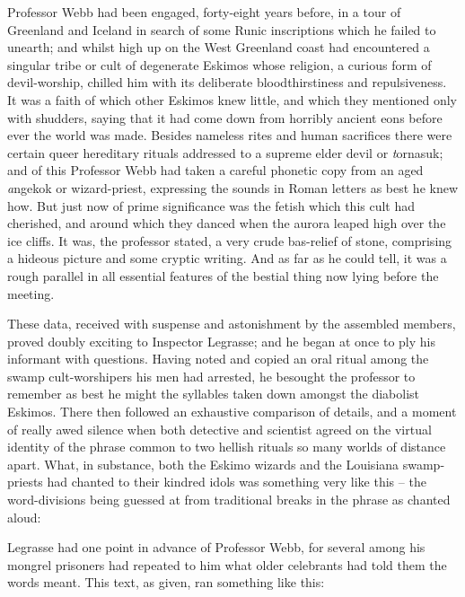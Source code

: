 Professor Webb had been engaged, forty-eight years before, in a tour of Greenland and Iceland in search of some Runic inscriptions which he failed to unearth; and whilst high up on the West Greenland coast had encountered a singular tribe or cult of degenerate Eskimos whose religion, a curious form of devil-worship, chilled him with its deliberate bloodthirstiness and repulsiveness. It was a faith of which other Eskimos knew little, and which they mentioned only with shudders, saying that it had come down from horribly ancient eons before ever the world was made. Besides nameless rites and human sacrifices there were certain queer hereditary rituals addressed to a supreme elder devil or {\emph tornasuk}; and of this Professor Webb had taken a careful phonetic copy from an aged {\emph angekok} or wizard-priest, expressing the sounds in Roman letters as best he knew how. But just now of prime significance was the fetish which this cult had cherished, and around which they danced when the aurora leaped high over the ice cliffs. It was, the professor stated, a very crude bas-relief of stone, comprising a hideous picture and some cryptic writing. And as far as he could tell, it was a rough parallel in all essential features of the bestial thing now lying before the meeting.

These data, received with suspense and astonishment by the assembled members, proved doubly exciting to Inspector Legrasse; and he began at once to ply his informant with questions. Having noted and copied an oral ritual among the swamp cult-worshipers his men had arrested, he besought the professor to remember as best he might the syllables taken down amongst the diabolist Eskimos. There then followed an exhaustive comparison of details, and a moment of really awed silence when both detective and scientist agreed on the virtual identity of the phrase common to two hellish rituals so many worlds of distance apart. What, in substance, both the Eskimo wizards and the Louisiana swamp-priests had chanted to their kindred idols was something very like this⁠ – the word-divisions being guessed at from traditional breaks in the phrase as chanted aloud:

\beginblockquote
{}
\endblockquote

Legrasse had one point in advance of Professor Webb, for several among his mongrel prisoners had repeated to him what older celebrants had told them the words meant. This text, as given, ran something like this:

